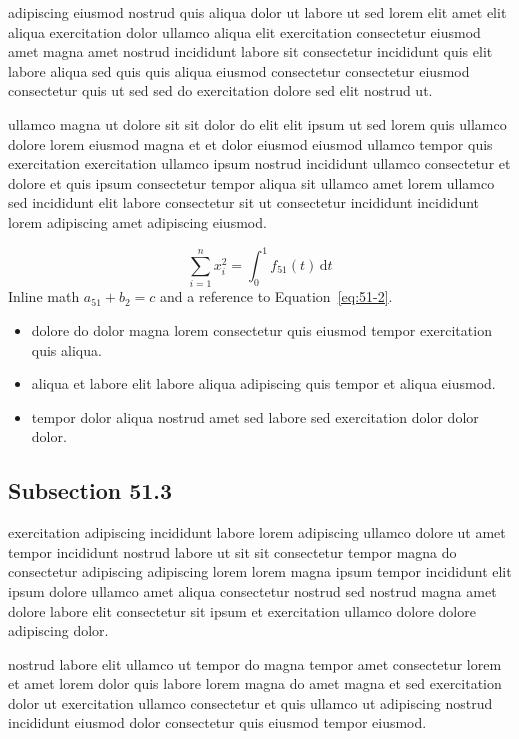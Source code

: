 \documentclass{article}
\begin{document}
adipiscing eiusmod nostrud quis aliqua dolor ut labore ut sed lorem elit amet elit aliqua exercitation dolor ullamco aliqua elit exercitation consectetur eiusmod amet magna amet nostrud incididunt labore sit consectetur incididunt quis elit labore aliqua sed quis quis aliqua eiusmod consectetur consectetur eiusmod consectetur quis ut sed sed do exercitation dolore sed elit nostrud ut.

ullamco magna ut dolore sit sit dolor do elit elit ipsum ut sed lorem quis ullamco dolore lorem eiusmod magna et et dolor eiusmod eiusmod ullamco tempor quis exercitation exercitation ullamco ipsum nostrud incididunt ullamco consectetur et dolore et quis ipsum consectetur tempor aliqua sit ullamco amet lorem ullamco sed incididunt elit labore consectetur sit ut consectetur incididunt incididunt lorem adipiscing amet adipiscing eiusmod.

\begin{equation}\label{eq:51-2}
  \sum_{i=1}^{n} x_i^{2} = \int_0^1 f_{51}(t)\,\mathrm{d}t
\end{equation}
Inline math $a_{51} + b_{2} = c$ and a reference to Equation~\eqref{eq:51-2}.

\begin{itemize}
  \item dolore do dolor magna lorem consectetur quis eiusmod tempor exercitation quis aliqua.
  \item aliqua et labore elit labore aliqua adipiscing quis tempor et aliqua eiusmod.
  \item tempor dolor aliqua nostrud amet sed labore sed exercitation dolor dolor dolor.
\end{itemize}

\subsection{Subsection 51.3}\label{sec:51-3}
exercitation adipiscing incididunt labore lorem adipiscing ullamco dolore ut amet tempor incididunt nostrud labore ut sit sit consectetur tempor magna do consectetur adipiscing adipiscing lorem lorem magna ipsum tempor incididunt elit ipsum dolore ullamco amet aliqua consectetur nostrud sed nostrud magna amet dolore labore elit consectetur sit ipsum et exercitation ullamco dolore dolore adipiscing dolor.

nostrud labore elit ullamco ut tempor do magna tempor amet consectetur lorem et amet lorem dolor quis labore lorem magna do amet magna et sed exercitation dolor ut exercitation ullamco consectetur et quis ullamco ut adipiscing nostrud incididunt eiusmod dolor consectetur quis eiusmod tempor eiusmod.
\end{document}
